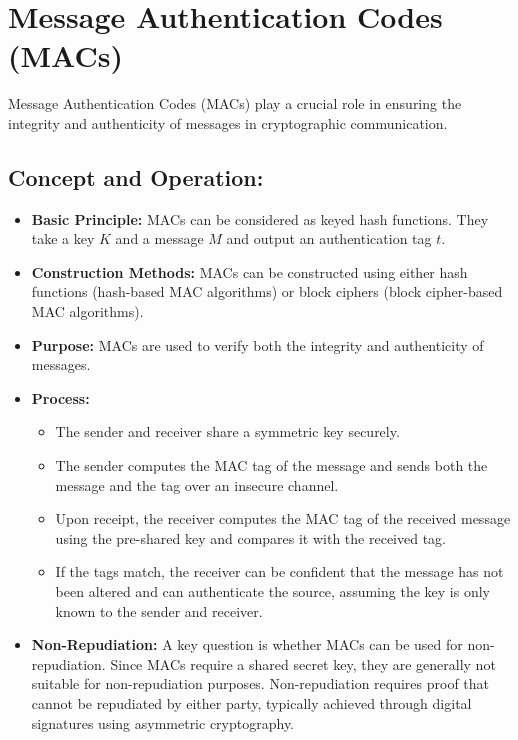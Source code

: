 \documentclass[12pt]{article}
\begin{document}
\section*{Message Authentication Codes (MACs)}

Message Authentication Codes (MACs) play a crucial role in ensuring the integrity and authenticity of messages in cryptographic communication.

\subsection*{Concept and Operation:}
\begin{itemize}
    \item \textbf{Basic Principle:} MACs can be considered as keyed hash functions. They take a key \( K \) and a message \( M \) and output an authentication tag \( t \).
    \item \textbf{Construction Methods:} MACs can be constructed using either hash functions (hash-based MAC algorithms) or block ciphers (block cipher-based MAC algorithms).
    \item \textbf{Purpose:} MACs are used to verify both the integrity and authenticity of messages.
    \item \textbf{Process:}
    \begin{itemize}
        \item The sender and receiver share a symmetric key securely.
        \item The sender computes the MAC tag of the message and sends both the message and the tag over an insecure channel.
        \item Upon receipt, the receiver computes the MAC tag of the received message using the pre-shared key and compares it with the received tag.
        \item If the tags match, the receiver can be confident that the message has not been altered and can authenticate the source, assuming the key is only known to the sender and receiver.
    \end{itemize}
    \item \textbf{Non-Repudiation:} A key question is whether MACs can be used for non-repudiation. Since MACs require a shared secret key, they are generally not suitable for non-repudiation purposes. Non-repudiation requires proof that cannot be repudiated by either party, typically achieved through digital signatures using asymmetric cryptography.
\end{itemize}
\end{document}
